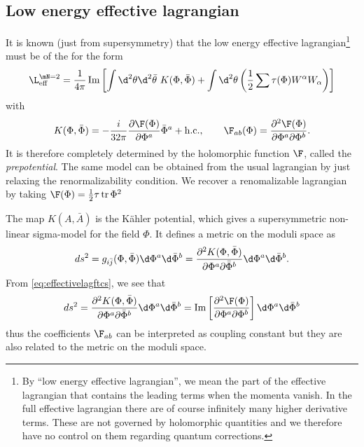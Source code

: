 \documentclass{worksheetclass}
\begin{document}
    \subsection{Low energy effective lagrangian}

        It is known (just from supersymmetry) that the low energy effective lagrangian\footnote{By ``low energy effective lagrangian'', we mean the part of the effective lagrangian that contains the leading terms when the momenta vanish. In the full effective lagrangian there are of course infinitely many higher derivative terms. These are not governed by holomorphic quantities and we therefore have no control on them regarding quantum corrections.} must be of the for the form
        \begin{equation}
            \L^{\mN=2}_{\text{eff}} = \frac{1}{4\pi}\Im\left[\int\d^2\theta\d^2\bar{\theta}~K(\Phi,\bar{\Phi})+\int\d^2\theta\left(\frac{1}{2}\sum\tau(\Phi)W^\alpha W_\alpha\right)\right]
        \end{equation}
        with
        \begin{equation}
            K(\Phi,\bar{\Phi})=-\frac{i}{32\pi}\pdv{\F(\Phi)}{\Phi^a}\bar{\Phi}^a+\text{h.c.},\qquad \F_{ab}(\Phi)=\pdv{\F(\Phi)}{\Phi^a}{\Phi^b}.\label{eq:effectivelagftcs}
        \end{equation}
        It is therefore completely determined by the holomorphic function $\F$, called the \emph{prepotential}. The same model can be obtained from the usual lagrangian by just relaxing the renormalizability condition. We recover a renomalizable lagrangian by taking $\F(\Phi)=\frac{1}{2}\tau\tr\Phi^2$

        The map $K(A,\bar{A})$ is the Kähler potential, which gives a supersymmetric non-linear sigma-model for the field $\Phi$. It defines a metric on the moduli space as
        \begin{equation}
            ds^2=g_{i\bar{j}}(\Phi,\bar{\Phi})\d\Phi^a\d\bar{\Phi}^b = \pdv{K(\Phi,\bar{\Phi})}{\Phi^a}{\bar{\Phi}^b}\d\Phi^a\d\bar{\Phi}^b.
        \end{equation}
       From \eqref{eq:effectivelagftcs}, we see that 
        \begin{equation}
            ds^2=\pdv{K(\Phi,\bar{\Phi})}{\Phi^a}{\bar{\Phi}^b}\d\Phi^a\d\bar{\Phi}^b = \Im\left[\pdv{\F(\Phi)}{\Phi^a}{\Phi^b}\right]\d\Phi^a\d\bar{\Phi}^b
        \end{equation}
        thus the coefficients $\F_{ab}$ can be interpreted as coupling constant but they are also related to the metric on the moduli space.
\end{document}
